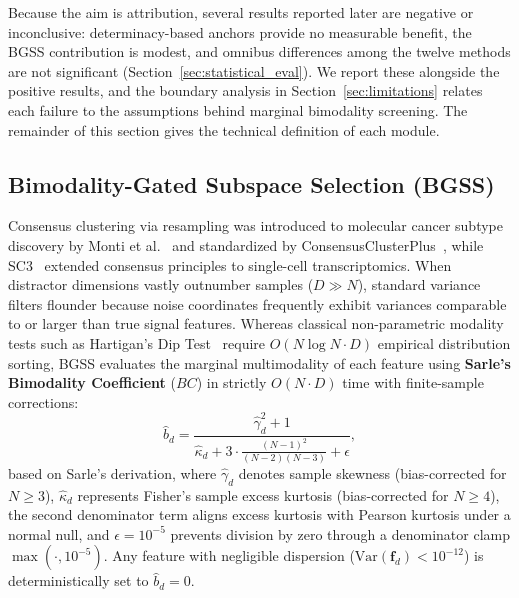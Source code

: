 \documentclass[pdflatex,sn-mathphys-num]{sn-jnl}
\theoremstyle{thmstyleone}
\theoremstyle{thmstyletwo}
\theoremstyle{thmstylethree}
\begin{document}
Because the aim is attribution, several results reported later are negative or inconclusive: determinacy-based anchors provide no measurable benefit, the BGSS contribution is modest, and omnibus differences among the twelve methods are not significant (Section~\ref{sec:statistical_eval}). We report these alongside the positive results, and the boundary analysis in Section~\ref{sec:limitations} relates each failure to the assumptions behind marginal bimodality screening. The remainder of this section gives the technical definition of each module.

\subsection{Bimodality-Gated Subspace Selection (BGSS)}\label{sec:bgss}
Consensus clustering via resampling was introduced to molecular cancer subtype discovery by Monti et al.~\cite{monti2003consensus} and standardized by ConsensusClusterPlus~\cite{wilkerson2010consensusclusterplus}, while SC3~\cite{kiselev2017sc3} extended consensus principles to single-cell transcriptomics. When distractor dimensions vastly outnumber samples ($D \gg N$), standard variance filters flounder because noise coordinates frequently exhibit variances comparable to or larger than true signal features. Whereas classical non-parametric modality tests such as Hartigan's Dip Test~\cite{hartigan1985dip} require $O(N \log N \cdot D)$ empirical distribution sorting, BGSS evaluates the marginal multimodality of each feature using \textbf{Sarle's Bimodality Coefficient} ($BC$) in strictly $O(N \cdot D)$ time with finite-sample corrections:
\begin{equation}\label{eq:sarle_bc}
 \hat{b}_d = \frac{\hat{\gamma}_d^2 + 1}{\hat{\kappa}_d + 3 \cdot \frac{(N-1)^2}{(N-2)(N-3)} + \epsilon},
\end{equation}
based on Sarle's derivation, where $\hat{\gamma}_d$ denotes sample skewness (bias-corrected for $N \ge 3$), $\hat{\kappa}_d$ represents Fisher's sample excess kurtosis (bias-corrected for $N \ge 4$), the second denominator term aligns excess kurtosis with Pearson kurtosis under a normal null, and $\epsilon = 10^{-5}$ prevents division by zero through a denominator clamp $\max(\cdot, 10^{-5})$. Any feature with negligible dispersion ($\mathrm{Var}(\mathbf{f}_d) < 10^{-12}$) is deterministically set to $\hat{b}_d = 0$.
\end{document}
